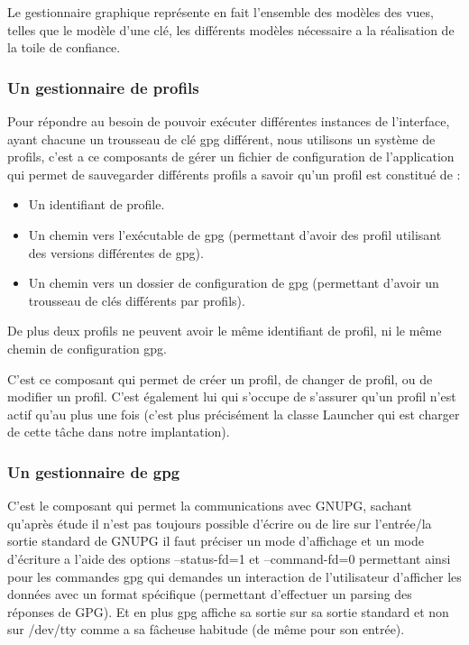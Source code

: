\documentclass{../res/univ-projet}
\begin{document}
      Le gestionnaire graphique représente en fait l'ensemble des modèles des vues,
      telles que le modèle d'une clé, les différents modèles nécessaire a la réalisation
      de la toile de confiance.

    \newpage
    \subsubsection{Un gestionnaire de profils}

      Pour répondre au besoin de pouvoir exécuter différentes instances de l'interface, ayant chacune
      un trousseau de clé gpg différent, nous utilisons un système de profils, c'est a ce composants
      de gérer un fichier de configuration de l'application qui permet de sauvegarder différents
      profils a savoir qu'un profil est constitué de :
      \begin{itemize}
        \item Un identifiant de profile.
        \item Un chemin vers l'exécutable de gpg (permettant d'avoir des profil utilisant des versions différentes de gpg).
        \item Un chemin vers un dossier de configuration de gpg (permettant d'avoir un trousseau de clés différents par profils).
      \end{itemize}
      De plus deux profils ne peuvent avoir le même identifiant de profil,
      ni le même chemin de configuration gpg.

      C'est ce composant qui permet de créer un profil, de changer de profil, ou de modifier un profil.
      C'est également lui qui s'occupe de s'assurer qu'un profil n'est actif qu'au plus une fois
      (c'est plus précisément la classe Launcher qui est charger de cette tâche dans notre implantation).

    \subsubsection{Un gestionnaire de gpg}

      C'est le composant qui permet la communications avec GNUPG,
      sachant qu'après étude il n'est pas toujours possible d'écrire ou de lire sur l'entrée/la sortie standard de GNUPG
      il faut préciser un mode d'affichage et un mode d'écriture a l'aide des options --status-fd=1 et --command-fd=0
      permettant ainsi pour les commandes gpg qui demandes un interaction de l'utilisateur d'afficher
      les données avec un format spécifique (permettant d'effectuer un parsing des réponses de GPG).
      Et en plus gpg affiche sa sortie sur sa sortie standard et non sur /dev/tty comme a sa fâcheuse habitude (de même pour son entrée).
\end{document}
